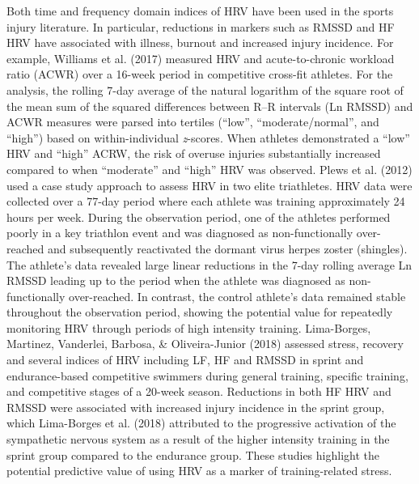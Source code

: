 \documentclass[
  english,
  man,floatsintext]{apa6}
\begin{document}
Both time and frequency domain indices of HRV have been used in the sports injury literature.
In particular, reductions in markers such as RMSSD and HF HRV have associated with illness, burnout and increased injury incidence.
For example, Williams et al. (2017) measured HRV and acute-to-chronic workload ratio (ACWR) over a 16-week period in competitive cross-fit athletes.
For the analysis, the rolling 7-day average of the natural logarithm of the square root of the mean sum of the squared differences between R--R intervals (Ln RMSSD) and ACWR measures were parsed into tertiles (\enquote{low}, \enquote{moderate/normal}, and \enquote{high}) based on within-individual \emph{z}-scores.
When athletes demonstrated a \enquote{low} HRV and \enquote{high} ACRW, the risk of overuse injuries substantially increased compared to when \enquote{moderate} and \enquote{high} HRV was observed.
Plews et al. (2012) used a case study approach to assess HRV in two elite triathletes.
HRV data were collected over a 77-day period where each athlete was training approximately 24 hours per week.
During the observation period, one of the athletes performed poorly in a key triathlon event and was diagnosed as non-functionally over-reached and subsequently reactivated the dormant virus herpes zoster (shingles).
The athlete's data revealed large linear reductions in the 7-day rolling average Ln RMSSD leading up to the period when the athlete was diagnosed as non-functionally over-reached.
In contrast, the control athlete's data remained stable throughout the observation period, showing the potential value for repeatedly monitoring HRV through periods of high intensity training.
Lima-Borges, Martinez, Vanderlei, Barbosa, \& Oliveira-Junior (2018) assessed stress, recovery and several indices of HRV including LF, HF and RMSSD in sprint and endurance-based competitive swimmers during general training, specific training, and competitive stages of a 20-week season.
Reductions in both HF HRV and RMSSD were associated with increased injury incidence in the sprint group, which Lima-Borges et al. (2018) attributed to the progressive activation of the sympathetic nervous system as a result of the higher intensity training in the sprint group compared to the endurance group.
These studies highlight the potential predictive value of using HRV as a marker of training-related stress.
\end{document}
